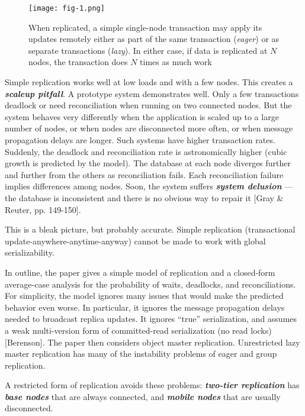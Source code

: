 \documentclass[a4paper,12pt,twoside,openright]{article}
\begin{document}
\begin{figure}
  \centering
  \texttt{[image: fig-1.png]}
  \caption{When replicated, a simple single-node transaction may
  apply its updates remotely either as part of the same transaction
  (\emph{eager}) or as separate transactions (\emph{lazy}). In either
  case, if data is replicated at \(N\) nodes, the transaction does
  \(N\) times as much work}
\end{figure}

Simple replication works well at low loads and with a few nodes. This
creates a \emph{\textbf{scaleup pitfall}}. A prototype system
demonstrates well. Only a few transactions deadlock or need
reconciliation when running on two connected nodes. But the system
behaves very differently when the application is scaled up to a large
number of nodes, or when nodes are disconnected more often, or when
message propagation delays are longer. Such systems have higher
transaction rates. Suddenly, the deadlock and reconciliation rate is
astronomically higher (cubic growth is predicted by the model). The
database at each node diverges further and further from the others as
reconciliation fails. Each reconciliation failure implies differences
among nodes. Soon, the system suffers \textbf{\emph{system delusion}}
--- the database is inconsistent and there is no obvious way to repair
it {[}Gray \& Reuter, pp. 149-150{]}.

This is a bleak picture, but probably accurate. Simple replication
(transactional update-anywhere-anytime-anyway) cannot be made to work
with global serializability.

In outline, the paper gives a simple model of replication and a
closed-form average-case analysis for the probability of waits,
deadlocks, and reconciliations. For simplicity, the model ignores many
issues that would make the predicted behavior even worse. In particular,
it ignores the message propagation delays needed to broadcast replica
updates. It ignores ``true'' serialization, and assumes a weak
multi-version form of committed-read serialization (no read locks)
{[}Berenson{]}. The paper then considers object master replication.
Unrestricted lazy master replication has many of the instability
problems of eager and group replication.

A restricted form of replication avoids these problems:
\emph{\textbf{two-tier replication}} has \emph{\textbf{base nodes}} that
are always connected, and \emph{\textbf{mobile nodes}} that are usually
disconnected.
\end{document}
